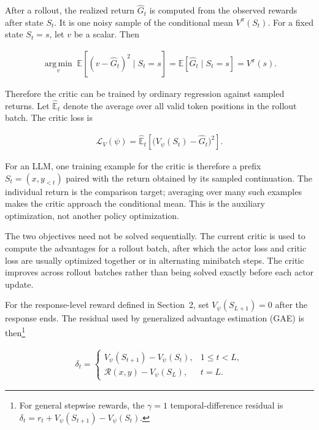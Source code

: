\documentclass[11pt]{article}
\newcommand{\E}{\mathbb{E}}
\begin{document}
After a rollout, the realized return \(\widehat G_t\) is computed from the
observed rewards after state \(S_t\).  It is one noisy sample of the
conditional mean \(V^\pi(S_t)\).  For a fixed state \(S_t=s\), let \(v\) be a
scalar.  Then

\begin{equation}
    \begin{split}
        \underset{v}{\operatorname{arg\,min}}\;
        \E\left[(v-\widehat G_t)^2\mid S_t=s\right]
        =\E\left[\widehat G_t\mid S_t=s\right]
        =V^\pi(s).
    \end{split}
    \label{eq:value-regression-identity}
\end{equation}

Therefore the critic can be trained by ordinary regression against sampled
returns.  Let \(\widehat{\E}_t\) denote the average over all valid token
positions in the rollout batch.  The critic loss is

\begin{equation}
    \begin{split}
        \mathcal L_V(\psi)
          =\widehat{\E}_t
           \left[\bigl(V_\psi(S_t)-\widehat G_t\bigr)^2\right].
    \end{split}
\end{equation}

For an LLM, one training example for the critic is therefore a prefix
\(S_t=(x,y_{<t})\) paired with the return obtained by its sampled continuation.
The individual return is the comparison target; averaging over many such
examples makes the critic approach the conditional mean.  This is the
auxiliary optimization, not another policy optimization.

The two objectives need not be solved sequentially.  The current critic is
used to compute the advantages for a rollout batch, after which the actor loss
and critic loss are usually optimized together or in alternating minibatch
steps.  The critic improves across rollout batches rather than being solved
exactly before each actor update.

For the response-level reward defined in Section~2, set
\(V_\psi(S_{L+1})=0\) after the response ends.  The residual used by
generalized advantage estimation (GAE) is then\footnote{For general stepwise rewards, the \(\gamma=1\) temporal-difference
residual is \(\delta_t=r_t+V_\psi(S_{t+1})-V_\psi(S_t)\).}

\begin{equation}
    \begin{split}
        \delta_t
        =\begin{cases}
          V_\psi(S_{t+1})-V_\psi(S_t), & 1\leq t<L,\\
          \mathcal R(x,y)-V_\psi(S_L), & t=L.
        \end{cases}
    \end{split}
    \label{eq:llm-td-residual}
\end{equation}
\end{document}
